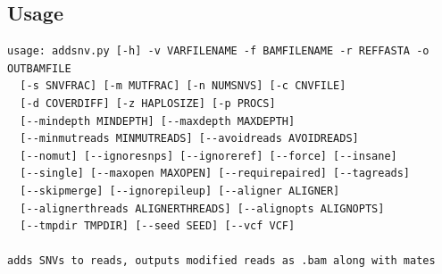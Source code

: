 \documentclass[letterpaper,11pt]{article}
\begin{document}
\subsection{Usage}
\begin{verbatim}
usage: addsnv.py [-h] -v VARFILENAME -f BAMFILENAME -r REFFASTA -o OUTBAMFILE
  [-s SNVFRAC] [-m MUTFRAC] [-n NUMSNVS] [-c CNVFILE]
  [-d COVERDIFF] [-z HAPLOSIZE] [-p PROCS]
  [--mindepth MINDEPTH] [--maxdepth MAXDEPTH]
  [--minmutreads MINMUTREADS] [--avoidreads AVOIDREADS]
  [--nomut] [--ignoresnps] [--ignoreref] [--force] [--insane]
  [--single] [--maxopen MAXOPEN] [--requirepaired] [--tagreads]
  [--skipmerge] [--ignorepileup] [--aligner ALIGNER]
  [--alignerthreads ALIGNERTHREADS] [--alignopts ALIGNOPTS]
  [--tmpdir TMPDIR] [--seed SEED] [--vcf VCF]

adds SNVs to reads, outputs modified reads as .bam along with mates


\end{verbatim}
\end{document}
